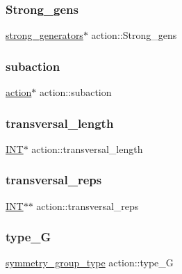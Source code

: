 \subsubsection{\texorpdfstring{Strong\+\_\+gens}{Strong\_gens}}
{\footnotesize\ttfamily \mbox{\hyperlink{classstrong__generators}{strong\+\_\+generators}}$\ast$ action\+::\+Strong\+\_\+gens}

\mbox{\label{classaction_ade6f692ab1da5e9fb5669c34b85b4823}} 
\subsubsection{\texorpdfstring{subaction}{subaction}}
{\footnotesize\ttfamily \mbox{\hyperlink{classaction}{action}}$\ast$ action\+::subaction}

\mbox{\label{classaction_a174a9e2c8ccd25f8181f10d00ecce7cd}} 
\subsubsection{\texorpdfstring{transversal\+\_\+length}{transversal\_length}}
{\footnotesize\ttfamily \mbox{\hyperlink{galois_8h_a09fddde158a3a20bd2dcadb609de11dc}{I\+NT}}$\ast$ action\+::transversal\+\_\+length}

\mbox{\label{classaction_a07efa01f3ae264db5a7168717c8cd473}} 
\subsubsection{\texorpdfstring{transversal\+\_\+reps}{transversal\_reps}}
{\footnotesize\ttfamily \mbox{\hyperlink{galois_8h_a09fddde158a3a20bd2dcadb609de11dc}{I\+NT}}$\ast$$\ast$ action\+::transversal\+\_\+reps}

\mbox{\label{classaction_afe244799cb488ee201e22cbe192db57d}} 
\subsubsection{\texorpdfstring{type\+\_\+G}{type\_G}}
{\footnotesize\ttfamily \mbox{\hyperlink{action_8h_a609fcdec33cc2d16c6c067d07931cba9}{symmetry\+\_\+group\+\_\+type}} action\+::type\+\_\+G}



